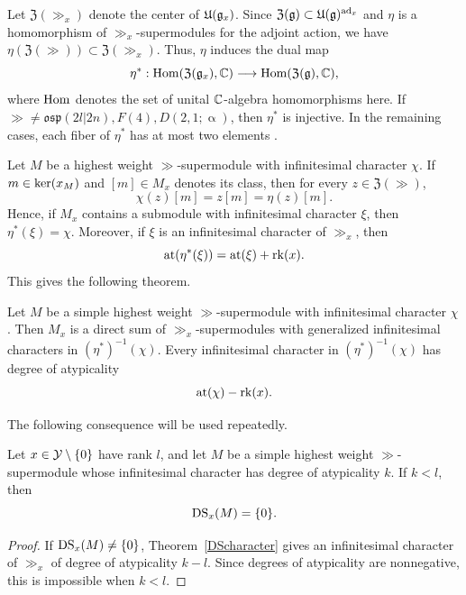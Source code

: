 Let $\mathfrak{Z}(\gg_{x})$ denote the center of ${\mathfrak U}({\mathfrak{g}}_{x})$. Since
$
\mathfrak{Z}({\mathfrak{g}})\subset{\mathfrak U}({\mathfrak{g}})^{\operatorname{ad}_{x}}
$
and $\eta$ is a homomorphism of $\gg_{x}$-supermodules for the adjoint action, we have
$
\eta(\mathfrak{Z}(\gg))\subset\mathfrak{Z}(\gg_{x}).
$
Thus, $\eta$ induces the dual map
\begin{equation}
\eta^{\ast}:
\operatorname{Hom}(\mathfrak{Z}({\mathfrak{g}}_{x}),{\mathbb C})
\longrightarrow
\operatorname{Hom}(\mathfrak{Z}({\mathfrak{g}}),{\mathbb C}), 
\end{equation}
where $\operatorname{Hom}$ denotes the set of unital ${\mathbb C}$-algebra homomorphisms here. If $\gg\neq\mathfrak{osp}(2l\vert 2n),F(4),D(2,1;\upalpha)$, then
$\eta^{\ast}$ is injective. In the remaining cases, each fiber of
$\eta^{\ast}$ has at most two elements
\cite[Theorem~6.12]{gorelik2022duflo}.

Let $M$ be a highest weight $\gg$-supermodule with infinitesimal character $\chi$. If $m\in\operatorname{ker}(x_{M})$ and $[m]\in M_{x}$ denotes its class, then for every $z\in\mathfrak{Z}(\gg)$,
\begin{equation}
\chi(z)[m]=z[m]=\eta(z)[m].
\end{equation}
Hence, if $M_{x}$ contains a submodule with infinitesimal character $\xi$, then
$
\eta^{\ast}(\xi)=\chi.
$
Moreover, if $\xi$ is an infinitesimal character of $\gg_{x}$, then~\cite[Corollary~6.9]{duflo2005associated}
\begin{equation}
{\operatorname{at}}(\eta^{\ast}(\xi))
=
{\operatorname{at}}(\xi)+{\operatorname{rk}}(x).
\end{equation}
This gives the following theorem.

\begin{theorem}\label{DScharacter}
Let $M$ be a simple highest weight $\gg$-supermodule with infinitesimal character $\chi$. Then $M_{x}$ is a direct sum of $\gg_{x}$-supermodules with generalized infinitesimal characters in $(\eta^{\ast})^{-1}(\chi)$. Every infinitesimal character in $(\eta^{\ast})^{-1}(\chi)$ has degree of atypicality
\[
{\operatorname{at}}(\chi)-{\operatorname{rk}}(x).
\]
\end{theorem}

The following consequence will be used repeatedly.

\begin{corollary}\label{DSNM}
Let $x\in{\mathcal Y}\setminus\{0\}$ have rank $l$, and let $M$ be a simple highest weight $\gg$-supermodule whose infinitesimal character has degree of atypicality $k$. If $k<l$, then
\[
\operatorname{DS}_{x}(M)=\{0\}.
\]
\end{corollary}

\begin{proof}
If $\operatorname{DS}_{x}(M)\neq\{0\}$, Theorem~\ref{DScharacter} gives an infinitesimal character of $\gg_{x}$ of degree of atypicality $k-l$. Since degrees of atypicality are nonnegative, this is impossible when $k<l$.
\end{proof}

